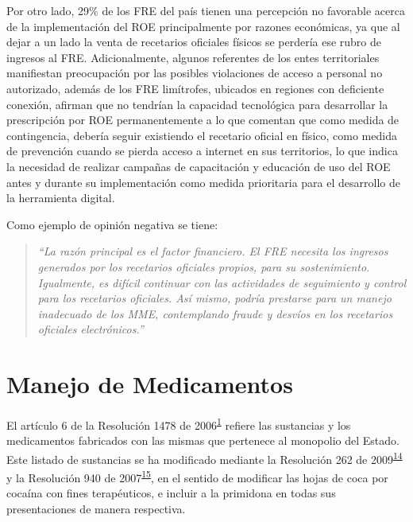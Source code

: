 \documentclass[
]{book}
\begin{document}
Por otro lado, 29\% de los FRE del país tienen una percepción no favorable acerca de la implementación del ROE principalmente por razones económicas, ya que al dejar a un lado la venta de recetarios oficiales físicos se perdería ese rubro de ingresos al FRE. Adicionalmente, algunos referentes de los entes territoriales manifiestan preocupación por las posibles violaciones de acceso a personal no autorizado, además de los FRE limítrofes, ubicados en regiones con deficiente conexión, afirman que no tendrían la capacidad tecnológica para desarrollar la prescripción por ROE permanentemente a lo que comentan que como medida de contingencia, debería seguir existiendo el recetario oficial en físico, como medida de prevención cuando se pierda acceso a internet en sus territorios, lo que indica la necesidad de realizar campañas de capacitación y educación de uso del ROE antes y durante su implementación como medida prioritaria para el desarrollo de la herramienta digital.

Como ejemplo de opinión negativa se tiene:

\begin{quote}
\emph{``La razón principal es el factor financiero. El FRE necesita los ingresos generados por los recetarios oficiales propios, para su sostenimiento. Igualmente, es difícil continuar con las actividades de seguimiento y control para los recetarios oficiales. Así mismo, podría prestarse para un manejo inadecuado de los MME, contemplando fraude y desvíos en los recetarios oficiales electrónicos.''}
\end{quote}

\hypertarget{manejo-de-medicamentos}{%
\chapter{Manejo de Medicamentos}\label{manejo-de-medicamentos}}


El artículo 6 de la Resolución 1478 de 2006\textsuperscript{\protect\hyperlink{ref-MSPS1478-2006}{1}} refiere las sustancias y los medicamentos fabricados con las mismas que pertenece al monopolio del Estado. Este listado de sustancias se ha modificado mediante la Resolución 262 de 2009\textsuperscript{\protect\hyperlink{ref-MSPS262-2009}{14}} y la Resolución 940 de 2007\textsuperscript{\protect\hyperlink{ref-MSPS940-2007}{15}}, en el sentido de modificar las hojas de coca por cocaína con fines terapéuticos, e incluir a la primidona en todas sus presentaciones de manera respectiva.
\end{document}
